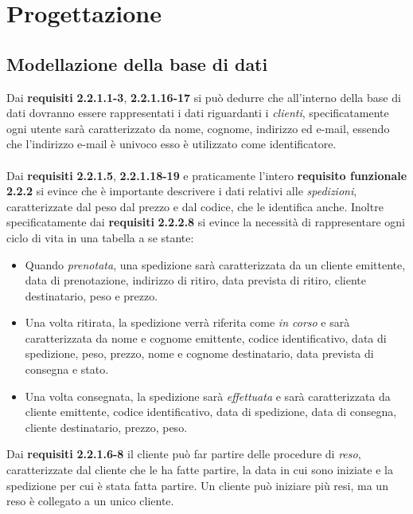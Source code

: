 \documentclass[a4paper,12pt]{article}
\begin{document}
\newpage
\section{Progettazione}
\subsection{Modellazione della base di dati}
Dai \textbf{requisiti} \textbf{2.2.1.1-3}, \textbf{2.2.1.16-17} si può dedurre che all'interno della base di dati dovranno essere rappresentati
i dati riguardanti i \textit{clienti}, specificatamente ogni utente sarà caratterizzato da nome, cognome, indirizzo ed e-mail, essendo 
che l'indirizzo e-mail è univoco esso è utilizzato come identificatore. 
\\\\
Dai \textbf{requisiti} \textbf{2.2.1.5}, \textbf{2.2.1.18-19} e praticamente l'intero \textbf{requisito funzionale }\textbf{2.2.2} si evince che è importante descrivere i dati relativi alle \textit{spedizioni}, caratterizzate dal peso dal prezzo e dal codice, che le identifica anche. Inoltre specificatamente dai \textbf{requisiti} \textbf{2.2.2.8} si evince la necessità di rappresentare ogni ciclo di vita in una tabella a se stante:
\begin{itemize}
	\item Quando \textit{prenotata}, una spedizione sarà caratterizzata da un cliente emittente, data di prenotazione, 
	indirizzo di ritiro, data prevista di ritiro, cliente destinatario, peso e prezzo.
	
	\item Una volta ritirata, la spedizione verrà riferita come \textit{in corso} e sarà caratterizzata da nome e cognome emittente, 
	codice identificativo, data di spedizione, peso, prezzo, nome e cognome destinatario, data prevista di consegna e stato.
	
	\item Una volta consegnata, la spedizione sarà \textit{effettuata} e sarà caratterizzata da cliente emittente, codice identificativo, 
	data di spedizione, data di consegna, cliente destinatario, prezzo, peso.
\end{itemize}  
Dai \textbf{requisiti} \textbf{2.2.1.6-8} il cliente può far partire delle procedure di \textit{reso}, caratterizzate dal cliente che le ha fatte partire, la data in cui sono iniziate e la spedizione per cui è stata fatta partire. Un cliente può iniziare più resi, ma un reso è collegato a un unico cliente.
\\\\
\end{document}
